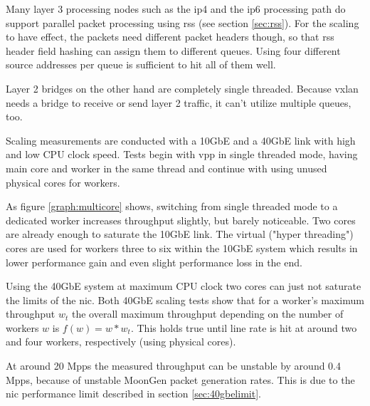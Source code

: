 Many layer 3 processing nodes such as the \Ac{ip4} and the \Ac{ip6}
processing path do support parallel packet processing using \Ac{rss}
(see section \ref{sec:rss}). For the scaling to have effect, the
packets need different packet headers though, so that \Ac{rss} header
field hashing can assign them to different queues. Using four
different source addresses per queue is sufficient to hit all of them
well.

Layer 2 bridges on the other hand are completely single threaded.
Because \Ac{vxlan} needs a bridge to receive or send layer 2 traffic,
it can't utilize multiple queues, too.

Scaling measurements are conducted with a 10GbE and a 40GbE link with
high and low CPU clock speed. Tests begin with \Ac{vpp} in
single threaded mode, having main core and worker in the same thread
and continue with using unused physical cores for workers.

As figure \ref{graph:multicore} shows, switching from single threaded
mode to a dedicated worker increases throughput slightly, but barely
noticeable. Two cores are already enough to saturate the 10GbE link.
The virtual ("hyper threading") cores are used for workers three to
six within the 10GbE system which results in lower performance gain
and even slight performance loss in the end.

Using the 40GbE system at maximum CPU clock two cores can just not
saturate the limits of the \Ac{nic}. Both 40GbE scaling tests show
that for a worker's maximum throughput $w_{t}$ the overall maximum
throughput depending on the number of workers $w$ is $f(w) = w *
w_{t}$. This holds true until line rate is hit at around two and four
workers, respectively (using physical cores).

At around 20 Mpps the measured throughput can be unstable by around 0.4
Mpps, because of unstable MoonGen packet generation rates. This is
due to the \Ac{nic} performance limit described in section
\ref{sec:40gbelimit}.





